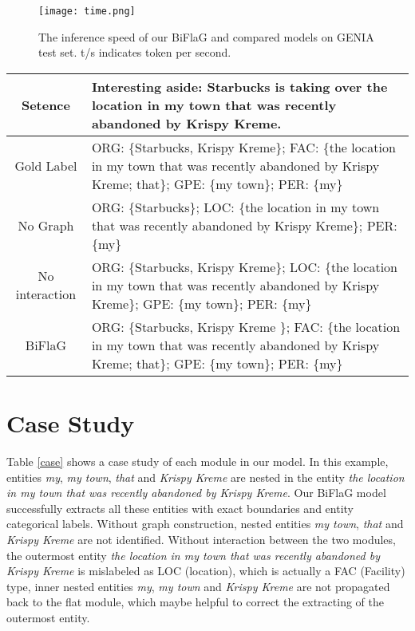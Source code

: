 \documentclass[11pt,a4paper]{article}
\begin{document}
\begin{figure}[!t]
  \centering 
  \texttt{[image: time.png]}
    \caption{The inference speed of our BiFlaG and
compared models on GENIA test set. t/s indicates token per second.}\label{time}
\end{figure} 

\begin{table*}[thbp]
\centering
\begin{tabular}{|c|p{}|}  
\hline
Setence & Interesting aside: Starbucks is  taking over the location in my town that was recently abandoned by Krispy Kreme. \\
\hline
Gold Label & ORG: \{Starbucks, Krispy Kreme\}; FAC: \{the location in my town that was recently abandoned by Krispy Kreme; that\}; GPE: \{my town\}; PER: \{my\} \\
\hline
No Graph & ORG: \{Starbucks\}; LOC: \{the location in my town that was recently abandoned by Krispy Kreme\}; PER: \{my\} \\
\hline
No interaction & ORG: \{Starbucks, Krispy Kreme\}; LOC: \{the location in my town that was recently abandoned by Krispy Kreme\}; GPE: \{my town\}; PER: \{my\} \\
\hline
BiFlaG & ORG: \{Starbucks, Krispy Kreme \}; FAC: \{the location in my town that was recently abandoned by Krispy Kreme; that\}; GPE: \{my town\}; PER: \{my\} \\ 
\hline
\end{tabular}
\caption{An example of predicted results in ACE2005 test dataset.}
\label{case}
\end{table*} 

\section{Case Study}
Table \ref{case} shows a case study of each module in our model. In this example, entities \emph{my}, \emph{my town}, \emph{that} and \emph{Krispy Kreme} are nested in the entity \emph{the location in my town that was recently abandoned by Krispy Kreme}. Our BiFlaG model successfully extracts all these entities with exact boundaries and entity categorical labels. Without graph construction, nested entities \emph{my town}, \emph{that} and \emph{Krispy Kreme} are not identified. Without interaction between the two modules, the outermost entity \emph{the location in my town that was recently abandoned by Krispy Kreme} is mislabeled as LOC (location), which is actually a FAC (Facility) type, inner nested entities \emph{my}, \emph{my town} and \emph{Krispy Kreme} are not propagated back to the flat module, which maybe helpful to correct the extracting of the outermost entity.
\end{document}
